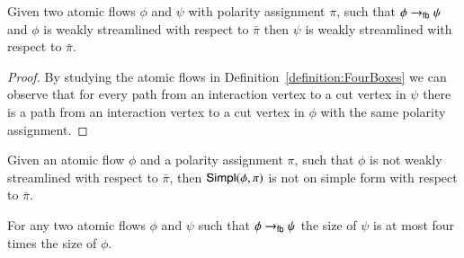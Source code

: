 \begin{lemma}\label{lemma:FourBoxesStreamlining}
Given two atomic flows $\phi$ and $\psi$ with polarity assignment $\pi$, such that $\phi\to_{\mathsf{fb}}\psi$ and $\phi$ is weakly streamlined with respect to $\bar\pi$ then $\psi$ is weakly streamlined with respect to $\bar\pi$.
\end{lemma}

\begin{proof}
By studying the atomic flows in Definition~\vref{definition:FourBoxes} we can observe that for every path from an interaction vertex to a cut vertex in $\psi$ there is a path from an interaction vertex to a cut vertex in $\phi$ with the same polarity assignment.
\end{proof}


\begin{remark}\label{remark:FourBoxesDestroySimpleForm}
Given an atomic flow $\phi$ and a polarity assignment $\pi$, such that $\phi$ is not weakly streamlined with respect to $\bar\pi$, then $\mathsf{Simpl}(\phi,\pi)$ is not on simple form with respect to $\bar\pi$.
\end{remark}


\begin{lemma}\label{lemma:FourBoxesSize}
For any two atomic flows $\phi$ and $\psi$ such that $\phi\to_{\mathsf{fb}}\psi$ the size of $\psi$ is at most four times the size of $\phi$.
\end{lemma}
